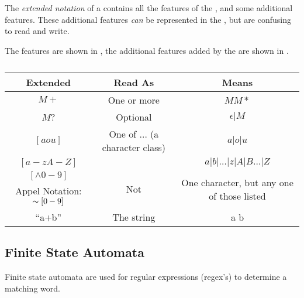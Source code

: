 \begin{definition}\label{def:Regex_Extended_Notation}
  The \emph{extended notation} of a  contains all the features of the , and some additional features.
  These additional features \emph{can} be represented in the , but are confusing to read and write.
  
  The  features are shown in , the additional features added by the  are shown in .

  \begin{table}[h!]
    \centering
    \begin{tabular}{ccc}
      \toprule
      Extended \nameref{def:Regular_Expression} & Read As & Means \\
      \midrule
      $M+$ & One or more & $M M*$ \\
      $M$? & Optional & $\epsilon \lvert M$ \\
      $[aou]$ & One of $\ldots$ (a character class) & $a \vert o \vert u$ \\
      $[a-zA-Z]$ & & $a \vert b \vert \ldots \vert z \vert A \vert B \ldots \vert Z$ \\
      $[\wedge 0-9]$ & \multirow{2}{*}{Not} & \multirow{2}{*}{One character, but any one of those listed} \\
      Appel Notation: $\thicksim{}[0-9]$ & & \\
      ``a+b'' & The string & a \+ b \\
      \bottomrule
    \end{tabular}
    \caption{ }
    \label{tab:Regex_Extended_Notation}
  \end{table}
\end{definition}

\subsection{Finite State Automata}\label{subsec:Finite State Automata}
Finite state automata are used for regular expressions (regex's) to determine a matching word.

